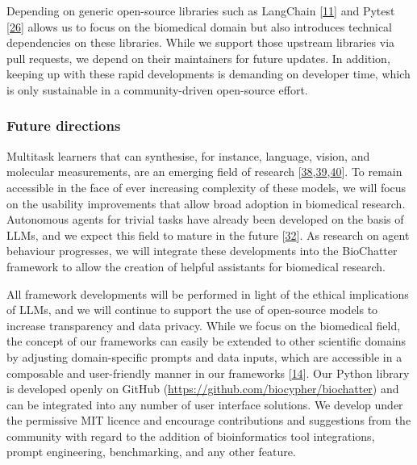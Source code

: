 Depending on generic open-source libraries such as LangChain {[}\protect\hyperlink{ref-UEmjXz02}{11}{]} and Pytest {[}\protect\hyperlink{ref-14upAJPXR}{26}{]} allows us to focus on the biomedical domain but also introduces technical dependencies on these libraries.
While we support those upstream libraries via pull requests, we depend on their maintainers for future updates.
In addition, keeping up with these rapid developments is demanding on developer time, which is only sustainable in a community-driven open-source effort.

\hypertarget{future-directions}{%
\subsubsection{Future directions}\label{future-directions}}

Multitask learners that can synthesise, for instance, language, vision, and molecular measurements, are an emerging field of research {[}\protect\hyperlink{ref-47ndFyxw}{38},\protect\hyperlink{ref-JbgxHZwW}{39},\protect\hyperlink{ref-43KJj9IS}{40}{]}.
To remain accessible in the face of ever increasing complexity of these models, we will focus on the usability improvements that allow broad adoption in biomedical research.
Autonomous agents for trivial tasks have already been developed on the basis of LLMs, and we expect this field to mature in the future {[}\protect\hyperlink{ref-lmJHElQl}{32}{]}.
As research on agent behaviour progresses, we will integrate these developments into the BioChatter framework to allow the creation of helpful assistants for biomedical research.

All framework developments will be performed in light of the ethical implications of LLMs, and we will continue to support the use of open-source models to increase transparency and data privacy.
While we focus on the biomedical field, the concept of our frameworks can easily be extended to other scientific domains by adjusting domain-specific prompts and data inputs, which are accessible in a composable and user-friendly manner in our frameworks {[}\protect\hyperlink{ref-tr1XjZ1R}{14}{]}.
Our Python library is developed openly on GitHub (\url{https://github.com/biocypher/biochatter}) and can be integrated into any number of user interface solutions.
We develop under the permissive MIT licence and encourage contributions and suggestions from the community with regard to the addition of bioinformatics tool integrations, prompt engineering, benchmarking, and any other feature.


